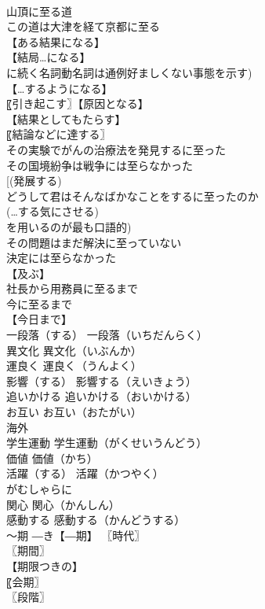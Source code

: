 \documentclass[8pt]{extreport}
\begin{document}
\begin{CJK}{UTF8}{min}
\\	山頂に至る道 
\\	この道は大津を経て京都に至る 
\\	【ある結果になる】 
\\	【結局…になる】
\\	に続く名詞動名詞は通例好ましくない事態を示す) 
\\	【…するようになる】
\\	〖引き起こす〗【原因となる】
\\	【結果としてもたらす】
\\	〖結論などに達する〗
\\	その実験でがんの治療法を発見するに至った 
\\	その国境紛争は戦争には至らなかった 
\\	[(発展する) 
\\	どうして君はそんなばかなことをするに至ったのか 
\\	(…する気にさせる) 
\\	を用いるのが最も口語的) 
\\	その問題はまだ解決に至っていない 
\\	決定には至らなかった 
\\	【及ぶ】 
\\	社長から用務員に至るまで 
\\	今に至るまで 
\\	【今日まで】
\\	一段落（する）		一段落（いちだんらく） 
\\	異文化		異文化（いぶんか） 
\\	運良く		運良く（うんよく） 
\\	影響（する）		影響する（えいきょう） 
\\	追いかける		追いかける（おいかける） 
\\	お互い		お互い（おたがい） 
\\	海外		
\\	学生運動		学生運動（がくせいうんどう） 
\\	価値		価値（かち） 
\\	活躍（する）		活躍（かつやく） 
\\	がむしゃらに		
\\	関心		関心（かんしん） 
\\	感動する		感動する（かんどうする） 
\\	〜期		―き【―期】 〖時代〗
\\	〖期間〗
\\	【期限つきの】
\\	〖会期〗
\\	〖段階〗

\end{CJK}
\end{document}
